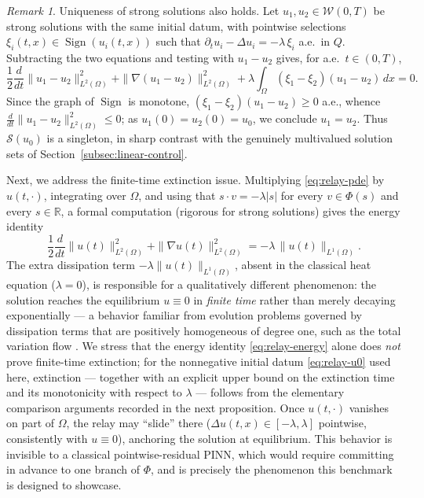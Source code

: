 \documentclass[11pt]{elsarticle}
\theoremstyle{definition}
\theoremstyle{remark}
\newtheorem{remark}[theorem]{Remark}
\numberwithin{equation}{section}
\DeclareMathOperator{\Sign}{Sign}
\begin{document}
\begin{remark}
	Uniqueness of strong solutions also holds. Let
	$u_1,u_2\in\mathcal{W}(0,T)$ be strong solutions with the same initial
	datum, with pointwise selections $\xi_i(t,x)\in\Sign(u_i(t,x))$ such
	that $\partial_tu_i-\Delta u_i=-\lambda\,\xi_i$ a.e.\ in $Q$.
	Subtracting the two equations and testing with $u_1-u_2$ gives, for
	a.e.\ $t\in(0,T)$,
	\[
	\frac12\frac{d}{dt}\|u_1-u_2\|_{L^2(\Omega)}^2
	+\|\nabla(u_1-u_2)\|_{L^2(\Omega)}^2
	+\lambda\int_\Omega(\xi_1-\xi_2)(u_1-u_2)\,dx
	=0.
	\]
	Since the graph of $\Sign$ is monotone,
	$(\xi_1-\xi_2)(u_1-u_2)\ge0$ a.e., whence
	$\frac{d}{dt}\|u_1-u_2\|_{L^2(\Omega)}^2\le0$; as $u_1(0)=u_2(0)=u_0$,
	we conclude $u_1=u_2$. Thus $\mathcal{S}(u_0)$ is a singleton, in sharp
	contrast with the genuinely multivalued solution sets of
	Section~\ref{subsec:linear-control}.
\end{remark}

Next, we address the finite-time extinction issue. Multiplying \eqref{eq:relay-pde} by $u(t,\cdot)$, integrating over $\Omega$,
and using that $s\cdot v = -\lambda|s|$ for every $v\in\Phi(s)$ and every
$s\in\mathbb{R}$, a formal computation (rigorous for strong solutions) gives
the energy identity
\begin{equation}
	\label{eq:relay-energy}
	\frac12\frac{d}{dt}\|u(t)\|_{L^2(\Omega)}^2
	+
	\|\nabla u(t)\|_{L^2(\Omega)}^2
	=
	-\lambda\,\|u(t)\|_{L^1(\Omega)}.
\end{equation}
The extra dissipation term $-\lambda\|u(t)\|_{L^1(\Omega)}$, absent in the
classical heat equation ($\lambda=0$), is responsible for a qualitatively
different phenomenon: the solution reaches the equilibrium $u\equiv0$ in
\emph{finite time} rather than merely decaying exponentially --- a behavior
familiar from evolution problems governed by dissipation terms that are
positively homogeneous of degree one, such as the total variation flow
\cite{AndreuCaselleMazon2004}. We stress that the energy identity
\eqref{eq:relay-energy} alone does \emph{not} prove finite-time extinction;
for the nonnegative initial datum \eqref{eq:relay-u0} used here, extinction
--- together with an explicit upper bound on the extinction time and its
monotonicity with respect to $\lambda$ --- follows from the elementary
comparison arguments recorded in the next proposition. Once $u(t,\cdot)$
vanishes on part of $\Omega$, the relay may ``slide'' there
($\Delta u(t,x)\in[-\lambda,\lambda]$
pointwise, consistently with $u\equiv0$), anchoring the solution at
equilibrium. This behavior is invisible to a classical pointwise-residual
PINN, which would require committing in advance to one branch of $\Phi$,
and is precisely the phenomenon this benchmark is designed to showcase.
\end{document}

